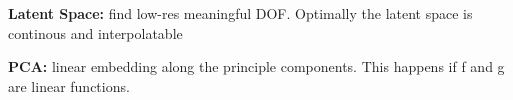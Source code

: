 \textbf{Latent Space:} find low-res meaningful DOF. Optimally the latent space is continous and interpolatable\\

\textbf{PCA:} linear embedding along the principle components. This happens if f and g are linear functions.\\

